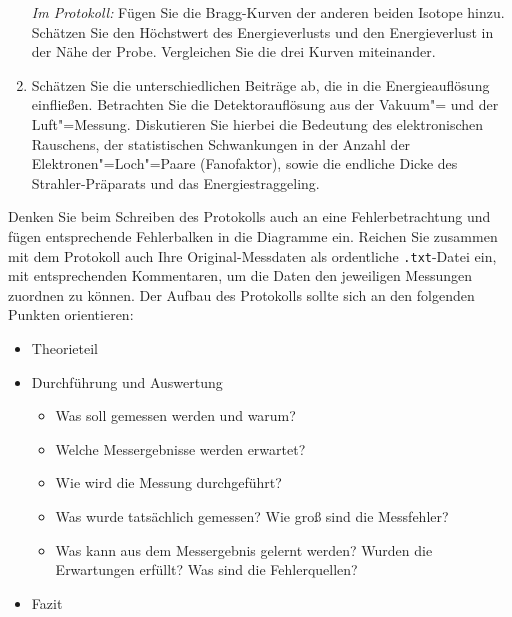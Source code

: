 \begin{enumerate}[label=\textbf{\alph*)}]
	\textit{Im Protokoll:} Fügen Sie die Bragg-Kurven der anderen beiden Isotope hinzu. Schätzen Sie den Höchstwert des Energieverlusts und den Energieverlust in der Nähe der Probe. Vergleichen Sie die drei Kurven miteinander.
	\item Schätzen Sie die unterschiedlichen Beiträge ab, die in die Energieauflösung einfließen. Betrachten Sie die Detektorauflösung aus der Vakuum"= und der Luft"=Messung. Diskutieren Sie hierbei die Bedeutung des elektronischen Rauschens, der statistischen Schwankungen in der Anzahl der Elektronen"=Loch"=Paare (Fanofaktor), sowie die endliche Dicke des Strahler-Präparats und das Energiestraggeling.
\end{enumerate}
%

\noindent
Denken Sie beim Schreiben des Protokolls auch an eine Fehlerbetrachtung und fügen entsprechende Fehlerbalken in die Diagramme ein. Reichen Sie zusammen mit dem Protokoll auch Ihre Original-Messdaten als ordentliche \texttt{.txt}-Datei ein, mit entsprechenden Kommentaren, um die Daten den jeweiligen Messungen zuordnen zu können. Der Aufbau des Protokolls sollte sich an den folgenden Punkten orientieren: 
\begin{itemize}
	\item Theorieteil
	\item Durchführung und Auswertung
	\begin{itemize}
		\item Was soll gemessen werden und warum?
		\item Welche Messergebnisse werden erwartet?
		\item Wie wird die Messung durchgeführt?
		\item Was wurde tatsächlich gemessen? Wie groß sind die Messfehler?
		\item Was kann aus dem Messergebnis gelernt werden? Wurden die Erwartungen erfüllt? Was sind die Fehlerquellen?
	\end{itemize}
	\item Fazit
\end{itemize}
